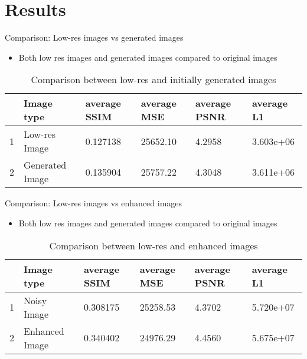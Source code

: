 \documentclass{beamer}
\begin{document}
\section{Results}
	\begin{frame}{Comparison: Low-res images vs generated images}
		\begin{itemize}
			\item Both low res images and generated images compared to original images
		\end{itemize}
		\begin{table}[htbp]
			\caption{Comparison between low-res and initially generated images}
			\begin{center}
				\begin{tabular}{| p{0.2cm}| p{2cm}| p{1.5cm}|p{1.8cm}|p{1.5cm}|p{1.8cm}|}
					
					\hline
					
					& Image type      & average SSIM & average MSE  & average PSNR & average L1 \\ \hline
					
					1      & Low-res Image     & 0.127138     & 25652.10 & 4.2958    & 3.603e+06     \\ \hline
					
					2      & Generated Image & 0.135904     & 25757.22 & 4.3048    & 3.611e+06     \\ \hline
					
					
				\end{tabular}
				\label{tab1}
			\end{center}
		\end{table}
	\end{frame}
	
	\begin{frame}{Comparison: Low-res images vs enhanced images}
		\begin{itemize}
			\item Both low res images and generated images compared to original images
		\end{itemize}
		\begin{table}[htbp]
			\caption{Comparison between low-res and enhanced images}
			\begin{center}
				\begin{tabular}{| p{0.2cm}| p{2cm}| p{1.5cm}|p{1.8cm}|p{1.5cm}|p{1.8cm}|}
					
					\hline
					
					& Image type     & average SSIM & average MSE  & average PSNR & average L1 \\ \hline
					
					1      & Noisy Image    & 0.308175     & 25258.53 & 4.3702     & 5.720e+07     \\ \hline
					
					2      & Enhanced Image & 0.340402     & 24976.29 & 4.4560     & 5.675e+07     \\ \hline
					
				\end{tabular}
				\label{tab2}
			\end{center}
		\end{table}
	\end{frame}
\end{document}
